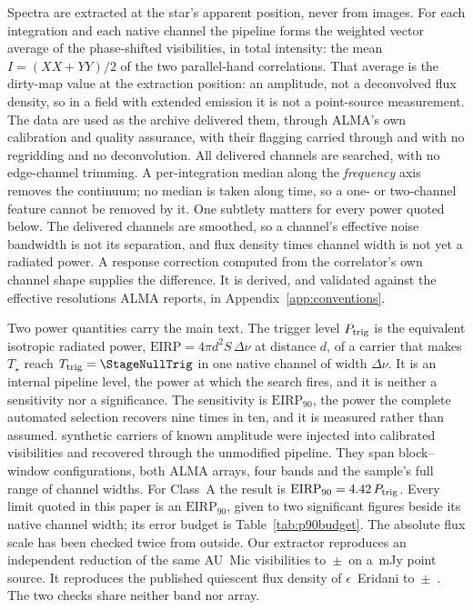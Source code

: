 Spectra are extracted at the star's apparent position, never from images.
For each integration and each native channel the pipeline forms the
weighted vector average of the phase-shifted visibilities, in total
intensity: the mean $I=(XX+YY)/2$ of the two parallel-hand
correlations. That average is the dirty-map value at the
extraction position: an amplitude, not a deconvolved flux density, so in
a field with extended emission it is not a point-source measurement. The data are used as the archive delivered them, through ALMA's own
calibration and quality assurance, with their flagging carried through
and with no regridding and no deconvolution. All delivered channels are searched,
with no edge-channel trimming. A per-integration median along the
\emph{frequency} axis removes the continuum; no median is taken along
time, so a one- or two-channel feature cannot be removed by it. One
subtlety matters for every power quoted below. The delivered channels are
smoothed, so a channel's effective noise bandwidth is not its separation,
and flux density times channel width is not yet a radiated power. A
response correction computed from the correlator's own channel shape
supplies the difference. It is derived, and validated against the
effective resolutions ALMA reports, in Appendix~\ref{app:conventions}.

Two power quantities carry the main text. The trigger level $P_{\rm
trig}$ is the equivalent isotropic radiated power,
$\mathrm{EIRP}=4\pi d^{2}S\,\Delta\nu$ at distance $d$, of a carrier that
makes $T_\star$ reach $T_{\rm trig}=\StageNullTrig$ in one native channel
of width $\Delta\nu$. It is an internal pipeline level, the power at
which the search fires, and it is neither a sensitivity nor a
significance. The sensitivity is $\mathrm{EIRP}_{90}$, the power the
complete automated selection recovers nine times in ten, and it is
measured rather than assumed. \SelNTone{} synthetic carriers of known
amplitude were injected into calibrated visibilities and recovered
through the unmodified pipeline. They span \SelNUnit{} block--window
configurations, both ALMA arrays, four bands and the sample's full range
of channel widths. For Class~A the result is
$\mathrm{EIRP}_{90}=4.42\,P_{\rm trig}$. Every limit quoted in
this paper is an $\mathrm{EIRP}_{90}$, given to two significant figures
beside its native channel width; its error budget is
Table~\ref{tab:p90budget}. The absolute flux scale has been checked twice
from outside. Our extractor reproduces an independent reduction of the
same AU~Mic visibilities to \PxJanRatio\,$\pm$\,\PxJanRatioErr{} on a
\PxJanFluxMJy\,mJy point source. It reproduces the published quiescent
flux density of $\epsilon$~Eridani to
\PxEpsRatio\,$\pm$\,\PxEpsRatioErr{} \citep{Burton2022}. The two checks
share neither band nor array.

